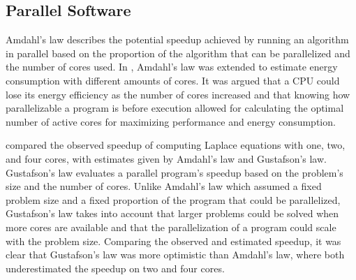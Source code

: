 \subsection{Parallel Software}

Amdahl's law describes the potential speedup achieved by running an algorithm in parallel based on the proportion of the algorithm that can be parallelized and the number of cores used.\cite{amdahl1967validity} In \cite{woo2008extending}, Amdahl's law was extended to estimate energy consumption with different amounts of cores. It was argued that a CPU could lose its energy efficiency as the number of cores increased and that knowing how parallelizable a program is before execution allowed for calculating the optimal number of active cores for maximizing performance and energy consumption.\cite{woo2008extending}

\cite{prinslow2011overview} compared the observed speedup of computing Laplace equations with one, two, and four cores, with estimates given by Amdahl's law and Gustafson's law. Gustafson's law evaluates a parallel program's speedup based on the problem's size and the number of cores. Unlike Amdahl's law which assumed a fixed problem size and a fixed proportion of the program that could be parallelized, Gustafson's law takes into account that larger problems could be solved when more cores are available and that the parallelization of a program could scale with the problem size. Comparing the observed and estimated speedup, it was clear that Gustafson's law was more optimistic than Amdahl's law, where both underestimated the speedup on two and four cores.\cite{prinslow2011overview}



